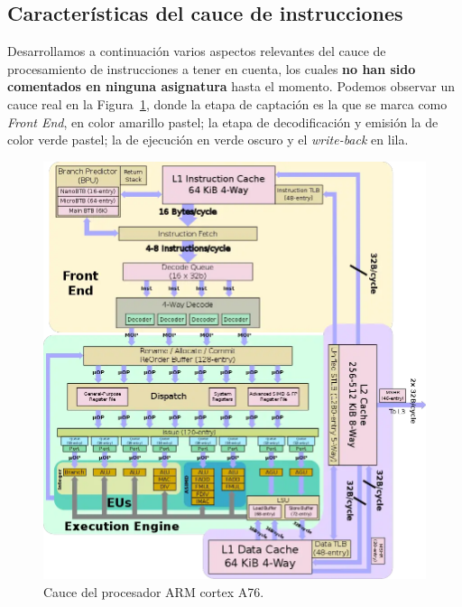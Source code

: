 \subsection{Características del cauce de instrucciones}
Desarrollamos a continuación varios aspectos relevantes del cauce de procesamiento de instrucciones a tener en cuenta, los cuales \textbf{no han sido comentados en ninguna asignatura} hasta el momento. Podemos observar un cauce real en la Figura~\ref{fig:Cauce_ARM_cortex_a76}, donde la etapa de captación es la que se marca como \emph{Front End}, en color amarillo pastel; la etapa de decodificación y emisión la de color verde pastel; la de ejecución en verde oscuro y el \emph{write-back} en lila.

\begin{figure}
    \centering
    \includegraphics[width=0.8\linewidth]{Images/Cauce1.png}
    \caption{Cauce del procesador ARM cortex A76.}
    \label{fig:Cauce_ARM_cortex_a76}
\end{figure}

